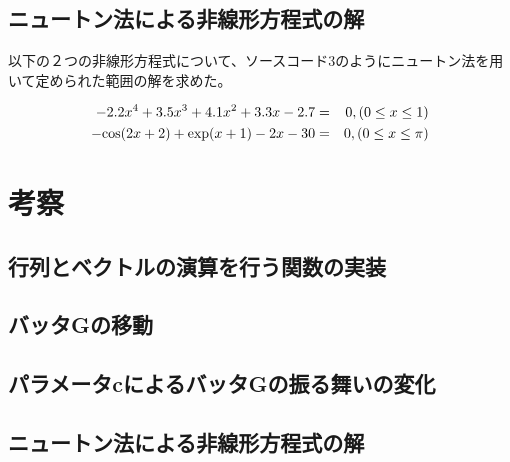 \documentclass[11pt]{ltjsarticle}
\begin{document}
\subsection{ニュートン法による非線形方程式の解}

以下の２つの非線形方程式について、ソースコード3のようにニュートン法を用いて定められた範囲の解を求めた。

\begin{eqnarray}
	- 2.2 x^4 + 3.5x^3 + 4.1x^2 + 3.3x - 2.7 & = & 0, (0 \leq x \leq 1) \\
	- {\rm cos}(2x+2) + {\rm exp}(x+1) - 2x -30 & = & 0, (0 \leq x \leq \pi)
\end{eqnarray}

\section{考察}

\subsection{行列とベクトルの演算を行う関数の実装}
\subsection{バッタGの移動}
\subsection{パラメータcによるバッタGの振る舞いの変化}
\subsection{ニュートン法による非線形方程式の解}
\end{document}

